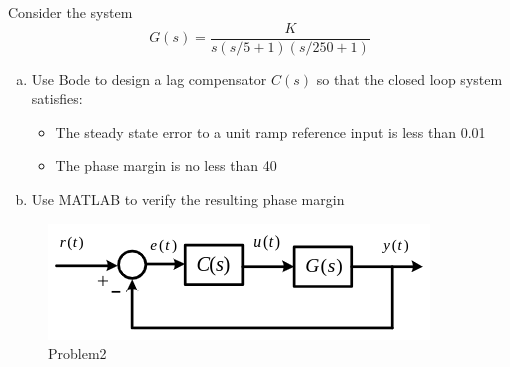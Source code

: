 \documentclass[11pt]{article}
\begin{document}
Consider the system
$$
G(s) = \frac{K}{s(s/5 + 1)(s/250 + 1)}
$$
\begin{enumerate}[a)]
    \item Use Bode to design a lag compensator $C(s)$ so that the closed loop system satisfies:
    \begin{itemize}
        \item The steady state error to a unit ramp reference input is less than 0.01
        \item The phase margin is no less than 40\degree
    \end{itemize}
    \item Use MATLAB to verify the resulting phase margin
\end{enumerate}
\begin{figure}[h] 
    \centering
    \includegraphics[width=0.55 \linewidth]{12-04-p1.png}
    \caption{Problem2}
    \label{fig:p2}
\end{figure}

\soln
\end{document}
